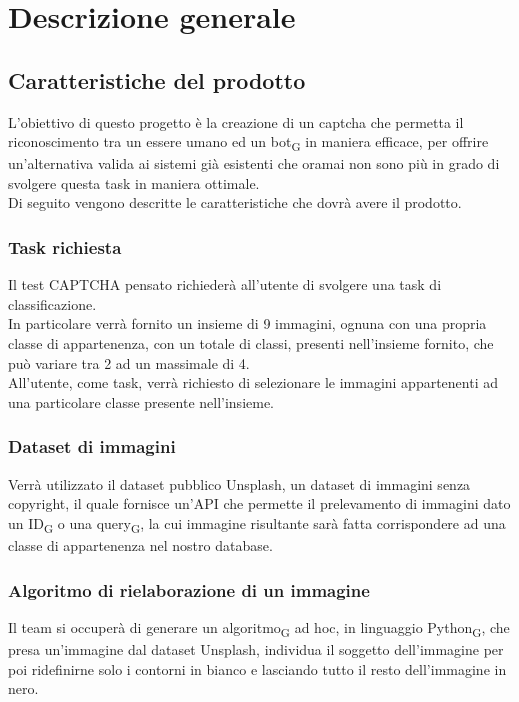 \section{Descrizione generale}

\subsection{Caratteristiche del prodotto}
L'obiettivo di questo progetto è la creazione di un captcha che permetta il riconoscimento tra un essere umano ed un bot\textsubscript{G} in maniera efficace, per offrire un'alternativa valida ai sistemi già esistenti che oramai non sono più in grado di svolgere questa task in maniera ottimale.\\

\noindent Di seguito vengono descritte le caratteristiche che dovrà avere il prodotto.

\subsubsection{Task richiesta}
Il test CAPTCHA pensato richiederà all'utente di svolgere una task di classificazione.\\
In particolare verrà fornito un insieme di 9 immagini, ognuna con una propria classe di appartenenza, con un totale di classi, presenti nell'insieme fornito, che può variare tra 2 ad un massimale di 4.\\
All'utente, come task, verrà richiesto di selezionare le immagini appartenenti ad una particolare classe presente nell'insieme.

\subsubsection{Dataset di immagini}
Verrà utilizzato il dataset pubblico Unsplash, un dataset di immagini senza copyright, il quale fornisce un'API che permette il prelevamento di immagini dato un ID\textsubscript{G} o una query\textsubscript{G}, la cui immagine risultante sarà fatta corrispondere ad una classe di appartenenza nel nostro database.

\subsubsection{Algoritmo di rielaborazione di un immagine}
Il team si occuperà di generare un algoritmo\textsubscript{G} ad hoc, in linguaggio Python\textsubscript{G}, che presa un'immagine dal dataset Unsplash, individua il soggetto dell'immagine per poi ridefinirne solo i contorni in bianco e lasciando tutto il resto dell'immagine in nero.  

